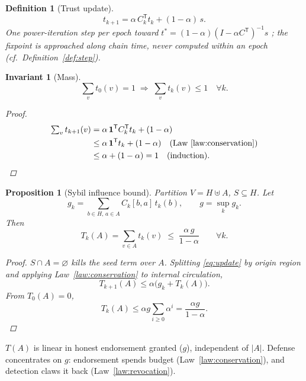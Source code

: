 \documentclass[11pt,letterpaper]{article}
\newtheorem{definition}{Definition}
\newtheorem{invariant}{Invariant}
\newtheorem{proposition}{Proposition}
\begin{document}
\begin{definition}[Trust update]\label{def:update}
\begin{equation}\label{eq:update}
t_{k+1}=\alpha\,C_k^{\mathsf T}t_k+(1-\alpha)\,s .
\end{equation}
One power-iteration step per epoch toward
$t^{*}=(1-\alpha)(I-\alpha C^{\mathsf T})^{-1}s$
\cite{PageRank,EigenTrust}; the fixpoint is approached along chain time,
never computed within an epoch (cf.\ Definition~\ref{def:step}).
\end{definition}

\begin{invariant}[Mass]\label{inv:mass}
\[
\textstyle\sum_v t_0(v)=1
\;\Rightarrow\;
\textstyle\sum_v t_k(v)\leq1\quad\forall k.
\]
\begin{proof}
\[
\begin{aligned}
\textstyle\sum_v t_{k+1}(v)
&=\alpha\,\mathbf{1}^{\mathsf T}C_k^{\mathsf T}t_k+(1-\alpha)\\
&\leq\alpha\,\mathbf{1}^{\mathsf T}t_k+(1-\alpha)
\quad\text{(Law~\ref{law:conservation})}\\
&\leq\alpha+(1-\alpha)=1
\quad\text{(induction)}.
\end{aligned}
\]
\end{proof}
\end{invariant}

\begin{proposition}[Sybil influence bound]\label{prop:sybil-bound}
Partition $V=H\uplus A$, $S\subseteq H$.  Let
\[
g_k=\sum_{b\in H,\,a\in A}C_k[b,a]\,t_k(b),\qquad
g=\sup_k g_k .
\]
Then
\[
T_k(A)=\sum_{v\in A}t_k(v)\;\leq\;\frac{\alpha\,g}{1-\alpha}
\qquad\forall k.
\]
\begin{proof}
$S\cap A=\varnothing$ kills the seed term over $A$.  Splitting
\eqref{eq:update} by origin region and applying
Law~\ref{law:conservation} to internal circulation,
\[
T_{k+1}(A)\leq\alpha\bigl(g_k+T_k(A)\bigr).
\]
From $T_0(A)=0$,
\[
T_k(A)\leq\alpha g\sum_{i\geq0}\alpha^{i}=\frac{\alpha g}{1-\alpha}.
\]
\end{proof}
\end{proposition}

$T(A)$ is linear in honest endorsement granted ($g$), independent of
$|A|$.  Defense concentrates on $g$: endorsement spends budget
(Law~\ref{law:conservation}), and detection claws it back
(Law~\ref{law:revocation}).
\end{document}
